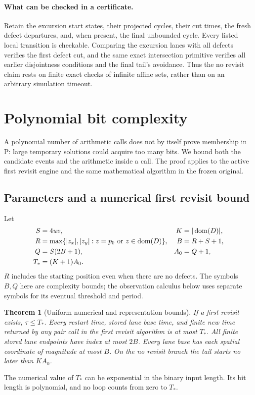 \documentclass[11pt,letterpaper]{article}
\newtheorem{theorem}{Theorem}[section]
\theoremstyle{definition}\newtheorem{definition}[theorem]{Definition}
\theoremstyle{remark}\newtheorem{remark}[theorem]{Remark}
\begin{document}
\paragraph{What can be checked in a certificate.}
Retain the excursion start states, their projected cycles, their cut times, the fresh defect departures, and, when present, the final unbounded cycle. Every listed local transition is checkable. Comparing the excursion lanes with all defects verifies the first defect cut, and the same exact intersection primitive verifies all earlier disjointness conditions and the final tail's avoidance. Thus the no revisit claim rests on finite exact checks of infinite affine sets, rather than on an arbitrary simulation timeout.

\section{Polynomial bit complexity}\label{ptr:sec:complexity}
A polynomial number of arithmetic calls does not by itself prove membership in P: large temporary solutions could acquire too many bits. We bound both the candidate events and the arithmetic inside a call. The proof applies to the active first revisit engine and the same mathematical algorithm in the frozen original.

\subsection{Parameters and a numerical first revisit bound}
Let
\begin{align}\label{ptr:eq:bounds}
 S&=4uv,&K&=|\operatorname{dom}(D)|,\\
 R&=\max\{|z_x|,|z_y|:z=p_0\text{ or }z\in\operatorname{dom}(D)\},&B&=R+S+1,\nonumber\\
 Q&=S(2B+1),&A_0&=Q+1,\nonumber\\
 T_*&=(K+1)A_0.&&\nonumber
\end{align}
$R$ includes the starting position even when there are no defects. The symbols $B,Q$ here are complexity bounds; the observation calculus below uses separate symbols for its eventual threshold and period.

\begin{theorem}[Uniform numerical and representation bounds]\label{ptr:thm:bounds}
If a first revisit exists, $\tau\le T_*$. Every restart time, stored lane base time, and finite new time returned by any pair call in the first revisit algorithm is at most $T_*$. All finite stored lane endpoints have index at most $2B$. Every lane base has each spatial coordinate of magnitude at most $B$. On the no revisit branch the tail starts no later than $KA_0$.
\end{theorem}
The numerical value of $T_*$ can be exponential in the binary input length. Its bit length is polynomial, and no loop counts from zero to $T_*$.
\end{document}
